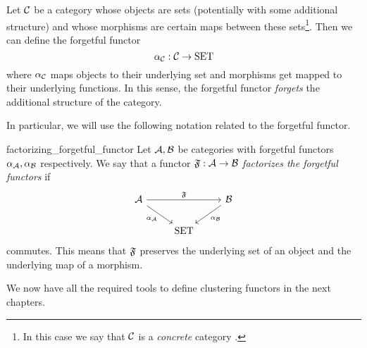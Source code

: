 \begin{definition}{\cite[Chap.~1~Ex.~10]{Roman2017}}{}
Let $\mathcal{C}$ be a category whose objects are sets (potentially with some additional structure) and whose morphisms are certain maps between these sets\footnote{In this case we say that $\mathcal{C}$ is a \emph{concrete} category \cite[p.~11]{Roman2017}.}. Then we can define the forgetful functor
$$
\alpha_{\mathcal{C}}: \mathcal{C} \to \mathrm{SET}
$$
where $\alpha_{\mathcal{C}}$ maps objects to their underlying set and morphisms get mapped to their underlying functions. In this sense, the forgetful functor \emph{forgets} the additional structure of the category.
\end{definition}

In particular, we will use the following notation related to the forgetful functor.

\begin{notation}{}{factorizing_forgetful_functor}
Let $\mathcal{A}, \mathcal{B}$ be categories with forgetful functors $\alpha_{\mathcal{A}}, \alpha_{\mathcal{B}}$ respectively. We say that a functor $\mathfrak{F}: \mathcal{A} \to \mathcal{B}$ \emph{factorizes the forgetful functors} if
\begin{equation*}
    \begin{tikzcd}
        \A \arrow[rr, "\mathfrak{F}"] \arrow[dr, "\alpha_\A"'] & & \B \arrow[dl, "\alpha_\B"] \\
        & \mathrm{SET} &
      \end{tikzcd}
\end{equation*}
commutes. This means that $\mathfrak{F}$ preserves the underlying set of an object and the underlying map of a morphism.
\end{notation}

\medskip We now have all the required tools to define clustering functors in the next chapters.